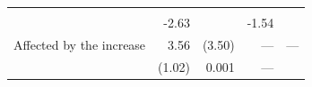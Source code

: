 \documentclass[11pt,a4paper,openany]{book}
\begin{document}
\begin{longtable}[]{@{}lrrrr@{}}
\begin{minipage}[t]{0.08\columnwidth}
\strut
\end{minipage} & \begin{minipage}[t]{0.06\columnwidth}\raggedleft\strut
\strut
\end{minipage}\tabularnewline
\begin{minipage}[t]{0.31\columnwidth}\raggedright\strut
\strut
\end{minipage} & \begin{minipage}[t]{0.19\columnwidth}\raggedleft\strut
-2.63\strut
\end{minipage} & \begin{minipage}[t]{0.19\columnwidth}\raggedleft\strut
\strut
\end{minipage} & \begin{minipage}[t]{0.08\columnwidth}\raggedleft\strut
-1.54\strut
\end{minipage} & \begin{minipage}[t]{0.06\columnwidth}\raggedleft\strut
\strut
\end{minipage}\tabularnewline
\begin{minipage}[t]{0.31\columnwidth}\raggedright\strut
Affected by the increase\strut
\end{minipage} & \begin{minipage}[t]{0.19\columnwidth}\raggedleft\strut
3.56\strut
\end{minipage} & \begin{minipage}[t]{0.19\columnwidth}\raggedleft\strut
(3.50)\strut
\end{minipage} & \begin{minipage}[t]{0.08\columnwidth}\raggedleft\strut
---\strut
\end{minipage} & \begin{minipage}[t]{0.06\columnwidth}\raggedleft\strut
---\strut
\end{minipage}\tabularnewline
\begin{minipage}[t]{0.31\columnwidth}\raggedright\strut
\strut
\end{minipage} & \begin{minipage}[t]{0.19\columnwidth}\raggedleft\strut
(1.02)\strut
\end{minipage} & \begin{minipage}[t]{0.19\columnwidth}\raggedleft\strut
0.001\strut
\end{minipage} & \begin{minipage}[t]{0.08\columnwidth}\raggedleft\strut
---\strut
\end{minipage} & \begin{minipage}[t]{0.06\columnwidth}\raggedleft\strut

\end{minipage}
\end{longtable}
\end{document}
